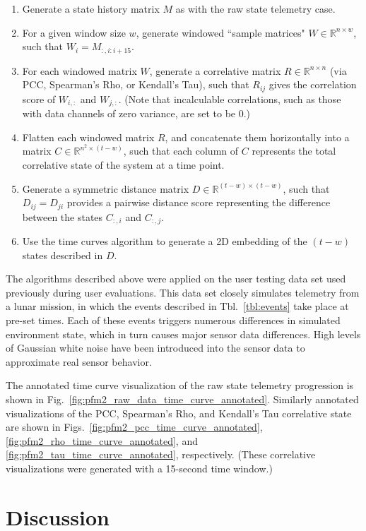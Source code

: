 \begin{enumerate}
    \item Generate a state history matrix $M$ as with the raw state telemetry case.
    \item For a given window size $w$, generate windowed ``sample matrices" $W \in \mathbb{R}^{n \times w}$, such that $W_{i} = M_{:, i:i+15}$.
    \item For each windowed matrix $W$, generate a correlative matrix $R \in \mathbb{R}^{n \times n}$ (via PCC, Spearman's Rho, or Kendall's Tau), such that $R_{ij}$ gives the correlation score of $W_{i,:}$ and $W_{j,:}$. (Note that incalculable correlations, such as those with data channels of zero variance, are set to be 0.)
    \item Flatten each windowed matrix $R$, and concatenate them horizontally into a matrix $C \in \mathbb{R}^{n^{2} \times (t - w)}$, such that each column of $C$ represents the total correlative state of the system at a time point.
    \item Generate a symmetric distance matrix $D \in \mathbb{R}^{(t - w) \times (t - w)}$, such that $D_{ij} = D_{ji}$ provides a pairwise distance score representing the difference between the states $C_{:,i}$ and $C_{:,j}$.
    \item Use the time curves algorithm to generate a 2D embedding of the $(t - w)$ states described in $D$.
\end{enumerate}

The algorithms described above were applied on the user testing data set used previously during user evaluations. This data set closely simulates telemetry from a lunar mission, in which the events described in Tbl.~\ref{tbl:events} take place at pre-set times. Each of these events triggers numerous differences in simulated environment state, which in turn causes major sensor data differences. High levels of Gaussian white noise have been introduced into the sensor data to approximate real sensor behavior.

The annotated time curve visualization of the raw state telemetry progression is shown in Fig.~\ref{fig:pfm2_raw_data_time_curve_annotated}. Similarly annotated visualizations of the PCC, Spearman's Rho, and Kendall's Tau correlative state are shown in Figs.~\ref{fig:pfm2_pcc_time_curve_annotated}, \ref{fig:pfm2_rho_time_curve_annotated}, and \ref{fig:pfm2_tau_time_curve_annotated}, respectively. (These correlative visualizations were generated with a 15-second time window.)

\section{Discussion}

